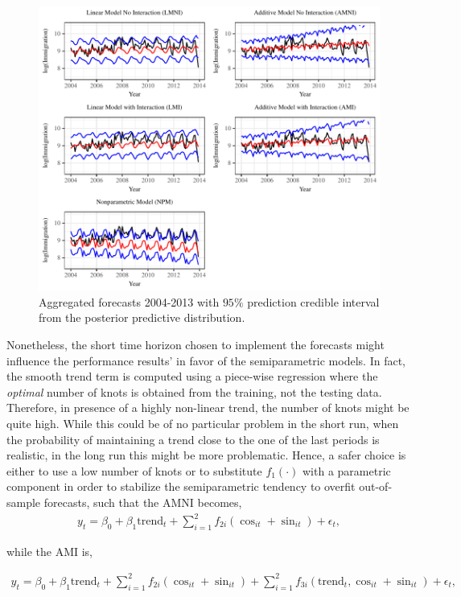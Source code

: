 \documentclass{article}\usepackage[]{graphicx}\usepackage[]{color}
\begin{document}
\begin{figure}[H]
\centering
\includegraphics[scale=1]{Short_run_rsults.pdf}
\caption{Aggregated forecasts 2004-2013 with $95\%$ prediction credible interval from the posterior predictive distribution.}
\label{fig:prediction}
\end{figure}


Nonetheless, the short time horizon chosen to implement the forecasts might influence the performance results' in favor of the semiparametric models. In fact, the smooth trend term is computed using a piece-wise regression where the \textit{optimal} number of knots is obtained from the training, not the testing data. Therefore, in presence of a highly non-linear trend, the number of knots might be quite high. While this could be of no particular problem in the short run, when the probability of maintaining a trend close to the one of the last periods is realistic, in the long run this might be more problematic. Hence, a safer choice is either to use a low number of knots or to substitute $f_1(\cdot)$ with a parametric component in order to stabilize the semiparametric tendency to overfit out-of-sample forecasts, such that the AMNI becomes,
\begin{align}\label{fourier_gam_no_int_long}
y_{t}=\beta_{0}+\beta_{1}\text{trend}_{t}+\sum_{i=1}^{2}f_{2i}(\cos_{it}+\sin_{it})+\epsilon_{t},
\end{align}

while the AMI is,

\begin{align}\label{fourier_gam_int_long}
y_{t}=\beta_{0}+\beta_{1}\text{trend}_{t}+\sum_{i=1}^{2}f_{2i}(\cos_{it}+\sin_{it})+\sum_{i=1}^{2}f_{3i}(\text{trend}_{t}, \cos_{it}+\sin_{it})+\epsilon_{t},
\end{align}
\end{document}
